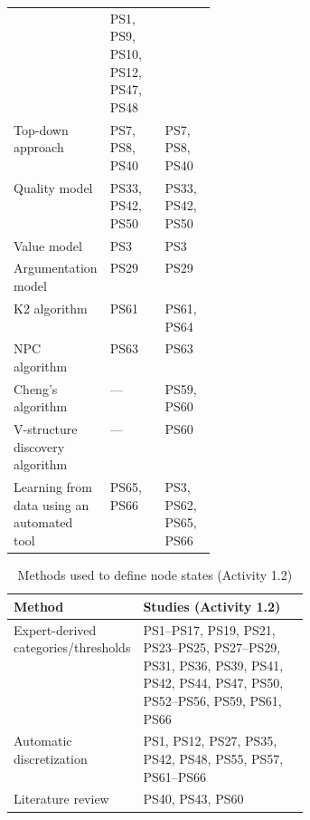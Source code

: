 \begin{table}[t]
\begin{tabularx}{\linewidth}{@{}>{\raggedright\arraybackslash}p{0.26\linewidth}
                            >{\raggedright\arraybackslash}X
                            >{\raggedright\arraybackslash}X@{}}
& PS1, PS9, PS10, PS12, PS47, PS48 \\
Top-down approach
& PS7, PS8, PS40
& PS7, PS8, PS40 \\
Quality model
& PS33, PS42, PS50
& PS33, PS42, PS50 \\
Value model
& PS3
& PS3 \\
Argumentation model
& PS29
& PS29 \\
K2 algorithm
& PS61
& PS61, PS64 \\
NPC algorithm
& PS63
& PS63 \\
Cheng's algorithm
& ---
& PS59, PS60 \\
V-structure discovery algorithm
& ---
& PS60 \\
Learning from data using an automated tool
& PS65, PS66
& PS3, PS62, PS65, PS66 \\
\bottomrule
\end{tabularx}
\end{table}

\begin{table}[t]
\caption{Methods used to define node states (Activity 1.2)}
\label{tab:app_methods_node_states}
\centering
\small
\setlength{\tabcolsep}{4pt}
\renewcommand{\arraystretch}{1.15}
\begin{tabularx}{\linewidth}{@{}>{\raggedright\arraybackslash}p{0.38\linewidth}
                            >{\raggedright\arraybackslash}X@{}}
\toprule
\textbf{Method} & \textbf{Studies (Activity 1.2)} \\
\midrule
Expert-derived categories/thresholds
& PS1--PS17, PS19, PS21, PS23--PS25, PS27--PS29, PS31, PS36, PS39, PS41, PS42, PS44, PS47, PS50, PS52--PS56, PS59, PS61, PS66 \\
Automatic discretization
& PS1, PS12, PS27, PS35, PS42, PS48, PS55, PS57, PS61--PS66 \\
Literature review
& PS40, PS43, PS60 \\
\bottomrule
\end{tabularx}
\end{table}

